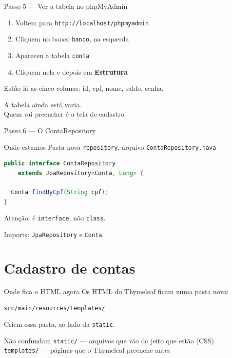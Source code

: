 \documentclass[aspectratio=169,11pt]{beamer}
\newcommand{\onde}[1]{%
  \begin{block}{Onde estamos}
    #1
  \end{block}
}
\begin{document}
\begin{frame}{Passo 5 --- Ver a tabela no phpMyAdmin}
  \begin{enumerate}
    \item Voltem para \texttt{http://localhost/phpmyadmin}
    \item Cliquem no banco \texttt{banco}, na esquerda
    \item Apareceu a tabela \texttt{conta}
    \item Cliquem nela e depois em \textbf{Estrutura}
  \end{enumerate}

  \vspace{0.5em}
  Estão lá as cinco colunas: id, cpf, nome, saldo, senha.

  \vspace{0.5em}
  A tabela ainda está vazia.\\
  Quem vai preencher é a tela de cadastro.
\end{frame}

\begin{frame}[fragile]{Passo 6 --- O ContaRepository}
  \onde{Pasta nova \texttt{repository}, arquivo \texttt{ContaRepository.java}}

\begin{lstlisting}[language=Java,basicstyle=\ttfamily\footnotesize]
public interface ContaRepository
    extends JpaRepository<Conta, Long> {

  Conta findByCpf(String cpf);
}
\end{lstlisting}

  \vspace{0.4em}
  Atenção: é \texttt{interface}, não \texttt{class}.

  \vspace{0.4em}
  Imports: \texttt{JpaRepository} e \texttt{Conta}.
\end{frame}

\section{Cadastro de contas}

\begin{frame}{Onde fica o HTML agora}
  Os HTML do Thymeleaf ficam numa pasta nova:

  \vspace{0.4em}
  \begin{center}
    \texttt{src/main/resources/templates/}
  \end{center}

  \vspace{0.4em}
  Criem essa pasta, ao lado da \texttt{static}.

  \vspace{0.5em}
  \begin{alertblock}{Não confundam}
    \texttt{static/} --- arquivos que vão do jeito que estão (CSS)\\
    \texttt{templates/} --- páginas que o Thymeleaf preenche antes
  \end{alertblock}
\end{frame}
\end{document}
